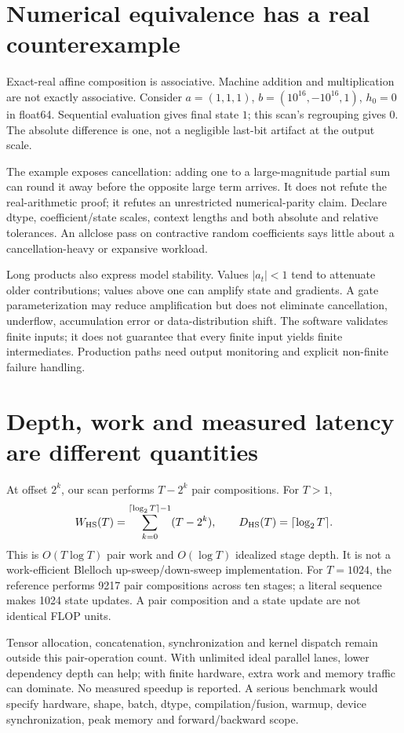 \section{Numerical equivalence has a real counterexample}
Exact-real affine composition is associative. Machine addition and multiplication
are not exactly associative. Consider $a=(1,1,1)$, $b=(10^{16},-10^{16},1)$,
$h_0=0$ in float64. Sequential evaluation gives final state $1$; this scan's
regrouping gives $0$. The absolute difference is one, not a negligible last-bit
artifact at the output scale.

The example exposes cancellation: adding one to a large-magnitude partial sum can
round it away before the opposite large term arrives. It does not refute the
real-arithmetic proof; it refutes an unrestricted numerical-parity claim.
Declare dtype, coefficient/state scales, context lengths and both absolute and
relative tolerances. An allclose pass on contractive random coefficients says
little about a cancellation-heavy or expansive workload.

Long products also express model stability. Values $|a_t|<1$ tend to attenuate
older contributions; values above one can amplify state and gradients.
A gate parameterization may reduce amplification but does not eliminate cancellation,
underflow, accumulation error or data-distribution shift.
The software validates finite inputs; it does not guarantee that every finite
input yields finite intermediates. Production paths need output monitoring and
explicit non-finite failure handling.

\section{Depth, work and measured latency are different quantities}
At offset $2^k$, our scan performs $T-2^k$ pair compositions. For $T>1$,
\[
W_{\rm HS}(T)=\sum_{k=0}^{\lceil\log_2T\rceil-1}(T-2^k),
\qquad
D_{\rm HS}(T)=\lceil\log_2T\rceil.
\]
This is $O(T\log T)$ pair work and $O(\log T)$ idealized stage depth.
It is not a work-efficient Blelloch up-sweep/down-sweep implementation.
For $T=1024$, the reference performs 9217 pair compositions across ten stages;
a literal sequence makes 1024 state updates. A pair composition and a state update
are not identical FLOP units.
\begin{center}\end{center}

Tensor allocation, concatenation, synchronization and kernel dispatch remain
outside this pair-operation count. With unlimited ideal parallel lanes, lower
dependency depth can help; with finite hardware, extra work and memory traffic
can dominate. No measured speedup is reported. A serious benchmark would specify
hardware, shape, batch, dtype, compilation/fusion, warmup, device synchronization,
peak memory and forward/backward scope.

